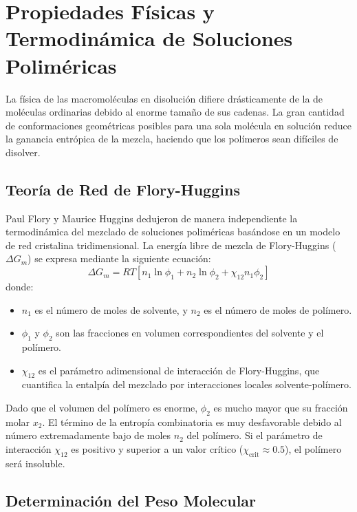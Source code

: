 \chapter{Propiedades Físicas y Termodinámica de Soluciones Poliméricas}
\label{cap:fisica}

La física de las macromoléculas en disolución difiere drásticamente de la de moléculas ordinarias debido al enorme tamaño de sus cadenas. La gran cantidad de conformaciones geométricas posibles para una sola molécula en solución reduce la ganancia entrópica de la mezcla, haciendo que los polímeros sean difíciles de disolver.

\section{Teoría de Red de Flory-Huggins}

Paul Flory y Maurice Huggins dedujeron de manera independiente la termodinámica del mezclado de soluciones poliméricas basándose en un modelo de red cristalina tridimensional. La energía libre de mezcla de Flory-Huggins ($\Delta G_m$) se expresa mediante la siguiente ecuación:
\begin{equation}
    \Delta G_m = R T \left[ n_1 \ln \phi_1 + n_2 \ln \phi_2 + \chi_{12} n_1 \phi_2 \right]
    \label{eq:flory_huggins}
\end{equation}
donde:
\begin{itemize}
    \item $n_1$ es el número de moles de solvente, y $n_2$ es el número de moles de polímero.
    \item $\phi_1$ y $\phi_2$ son las fracciones en volumen correspondientes del solvente y el polímero.
    \item $\chi_{12}$ es el parámetro adimensional de interacción de Flory-Huggins, que cuantifica la entalpía del mezclado por interacciones locales solvente-polímero.
\end{itemize}

Dado que el volumen del polímero es enorme, $\phi_2$ es mucho mayor que su fracción molar $x_2$. El término de la entropía combinatoria es muy desfavorable debido al número extremadamente bajo de moles $n_2$ del polímero. Si el parámetro de interacción $\chi_{12}$ es positivo y superior a un valor crítico ($\chi_{\text{crit}} \approx 0.5$), el polímero será insoluble.

\section{Determinación del Peso Molecular}

